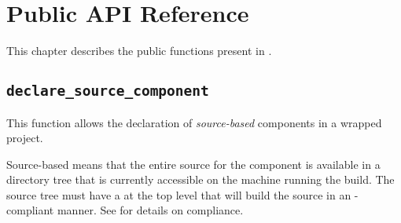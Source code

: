 %
%
%
%
\chapter{Public API Reference}\label{chap:api}

This chapter describes the public functions present in \lmsbw.

\section{\texttt{declare\_source\_component}}\label{api:declare-source-component}

This function allows the declaration of \emph{source-based} components
in a wrapped project.

Source-based means that the entire source for the component is
available in a directory tree that is currently accessible on the
machine running the build.  The source tree must have a \makefile at
the top level that will build the source in an \lmsbw-compliant
manner.  See  for details on \makefile
compliance.

